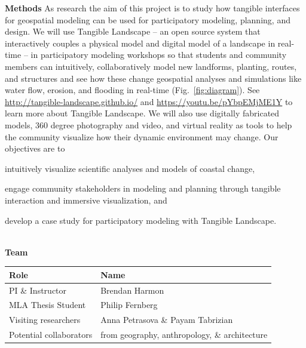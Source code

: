\documentclass[11pt,article,oneside]{memoir}
\begin{document}
\noindent \textbf{Methods}
As research the aim of this project is to
study how tangible interfaces for geospatial modeling
can be used for participatory modeling, planning, and design.
%
We will use Tangible Landscape 
-- an open source system that interactively couples 
a physical model and digital model of a landscape in real-time --
in participatory modeling workshops
so that students and community members 
can intuitively, collaboratively model new landforms, planting, routes, and structures
and see how these change geospatial analyses and simulations 
like water flow, erosion, and flooding
in real-time (Fig.~\ref{fig:diagram}). 
% 
See \url{http://tangible-landscape.github.io/}
and \url{https://youtu.be/pYbpEMjME1Y} 
to learn more about Tangible Landscape.
%
We will also use digitally fabricated models, 
360 degree photography and video, 
and virtual reality as tools 
to help the community visualize 
how their dynamic environment may change. 
%
Our objectives are to
\begin{enumerate*}[label=\alph*),font=\itshape]
\item intuitively visualize scientific analyses and models of coastal change,
\item engage community stakeholders in modeling and planning 
through tangible interaction and immersive visualization,
and
\item develop a case study for participatory modeling with Tangible Landscape.
\end{enumerate*} \\

\noindent \textbf{Team}
%
%
\begin{table}[H]
\small
\begin{tabu} to \textwidth {lX}
\toprule
Role & Name\\
\midrule
PI \& Instructor & Brendan Harmon \\
MLA Thesis Student & Philip Fernberg \\
Visiting researchers & Anna Petrasova \& Payam Tabrizian \\
Potential collaborators & from geography, anthropology, \& architecture \\
\bottomrule
\end{tabu}
\end{table}
\end{document}
